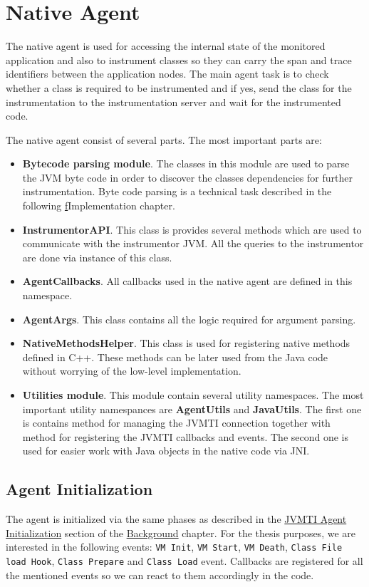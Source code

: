 \section{Native Agent}
\label{native_agent_design}
The native agent is used for accessing the internal state of the monitored application and also to instrument classes so they can carry the span and trace identifiers between the application nodes. The main agent task is to check whether a class is required to be instrumented and if yes, send the class for the instrumentation to the instrumentation server and wait for the instrumented code.

The native agent consist of several parts. The most important parts are:
\begin{itemize}
	\item \textbf{Bytecode parsing module}. The classes in this module are used to parse the JVM byte code in order to discover the classes dependencies for further instrumentation. Byte code parsing is a technical task described in the following \hyperref[chap:implementation]f{Implementation} chapter.
	\item \textbf{InstrumentorAPI}. This class is provides several methods which are used to communicate with the instrumentor JVM. All the queries to the instrumentor are done via instance of this class.
	\item \textbf{AgentCallbacks}. All callbacks used in the native agent are defined in this namespace.
	\item \textbf{AgentArgs}.  This class contains all the logic required for argument parsing.
	\item \textbf{NativeMethodsHelper}. This class is used for registering native methods defined in C++. These methods can be later used from the Java code without worrying of the low-level implementation.
	\item \textbf{Utilities module}. This module contain several utility namespaces. The most important utility namespances are \textbf{AgentUtils} and \textbf{JavaUtils}. The first one is contains method for managing the JVMTI connection together with method for registering the JVMTI callbacks and events. The second one is used for easier work with Java objects in the native code via JNI. 
\end{itemize}

\subsection{Agent Initialization}
The agent is initialized via the same phases as described in the \hyperref[subsec:jvmti_init]{JVMTI Agent Initialization}  section of the \hyperref[chap:background]{Background} chapter. For the thesis purposes, we are interested in the following events: \texttt{VM Init}, \texttt{VM Start}, \texttt{VM Death}, \texttt{Class File load Hook}, \texttt{Class Prepare} and \texttt{Class Load} event. Callbacks are registered for all the mentioned events so we can react to them accordingly in the code.


